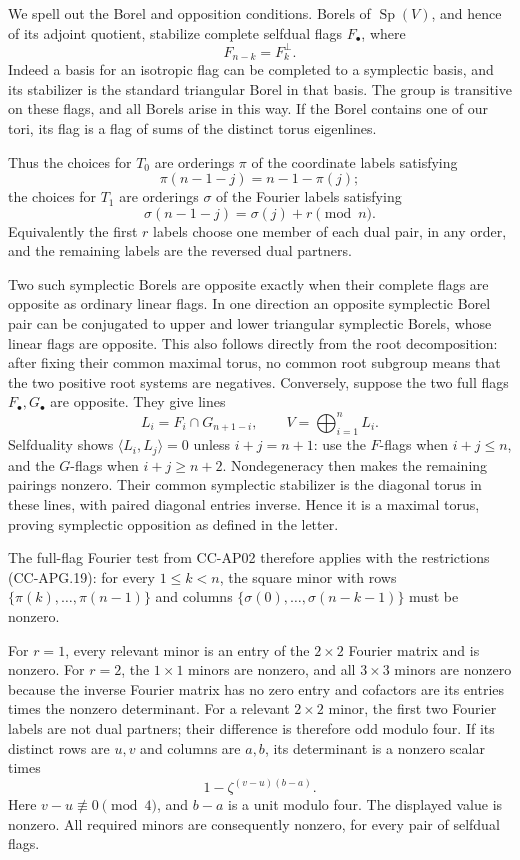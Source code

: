 We spell out the Borel and opposition conditions. Borels of
\(\operatorname{Sp}(V)\), and hence of its adjoint quotient, stabilize
complete selfdual flags \(F_\bullet\), where \[
 F_{n-k}=F_k^\perp.
\] Indeed a basis for an isotropic flag can be completed to a symplectic
basis, and its stabilizer is the standard triangular Borel in that
basis. The group is transitive on these flags, and all Borels arise in
this way. If the Borel contains one of our tori, its flag is a flag of
sums of the distinct torus eigenlines.

Thus the choices for \(T_0\) are orderings \(\pi\) of the coordinate
labels satisfying \[
 \pi(n-1-j)=n-1-\pi(j);
\] the choices for \(T_1\) are orderings \(\sigma\) of the Fourier
labels satisfying \[
 \sigma(n-1-j)=\sigma(j)+r\pmod n.
 \tag{CC-APG.19}
\] Equivalently the first \(r\) labels choose one member of each dual
pair, in any order, and the remaining labels are the reversed dual
partners.

Two such symplectic Borels are opposite exactly when their complete
flags are opposite as ordinary linear flags. In one direction an
opposite symplectic Borel pair can be conjugated to upper and lower
triangular symplectic Borels, whose linear flags are opposite. This also
follows directly from the root decomposition: after fixing their common
maximal torus, no common root subgroup means that the two positive root
systems are negatives. Conversely, suppose the two full flags
\(F_\bullet,G_\bullet\) are opposite. They give lines \[
 L_i=F_i\cap G_{n+1-i},\qquad
 V=\bigoplus_{i=1}^n L_i.
\] Selfduality shows \(\langle L_i,L_j\rangle=0\) unless \(i+j=n+1\):
use the \(F\)-flags when \(i+j\leq n\), and the \(G\)-flags when
\(i+j\geq n+2\). Nondegeneracy then makes the remaining pairings
nonzero. Their common symplectic stabilizer is the diagonal torus in
these lines, with paired diagonal entries inverse. Hence it is a maximal
torus, proving symplectic opposition as defined in the letter.

The full-flag Fourier test from CC-AP02 therefore applies with the
restrictions (CC-APG.19): for every \(1\leq k<n\), the square minor with
rows \(\{\pi(k),\ldots,\pi(n-1)\}\) and columns
\(\{\sigma(0),\ldots,\sigma(n-k-1)\}\) must be nonzero.

For \(r=1\), every relevant minor is an entry of the \(2\times2\)
Fourier matrix and is nonzero. For \(r=2\), the \(1\times1\) minors are
nonzero, and all \(3\times3\) minors are nonzero because the inverse
Fourier matrix has no zero entry and cofactors are its entries times the
nonzero determinant. For a relevant \(2\times2\) minor, the first two
Fourier labels are not dual partners; their difference is therefore odd
modulo four. If its distinct rows are \(u,v\) and columns are \(a,b\),
its determinant is a nonzero scalar times \[
 1-\zeta^{(v-u)(b-a)}.
\] Here \(v-u\not\equiv0\pmod4\), and \(b-a\) is a unit modulo four. The
displayed value is nonzero. All required minors are consequently
nonzero, for every pair of selfdual flags.

